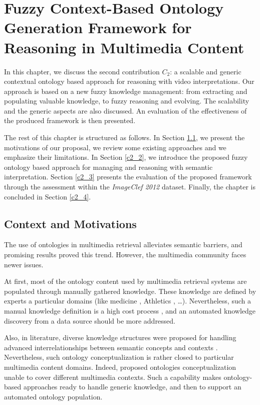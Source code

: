 \chapter{Fuzzy Context-Based Ontology Generation Framework for Reasoning in Multimedia Content}
\label{c2}
	In this chapter, we discuss the second contribution $C_{2}$: a scalable and generic contextual 
	ontology based approach for reasoning with video interpretations. Our approach is based on a new 
	fuzzy knowledge management: from extracting and populating valuable knowledge, to fuzzy reasoning 
	and evolving. The scalability and the generic aspects are also discussed. An evaluation of
	the effectiveness of the produced framework is then presented.

	The rest of this chapter is structured as follows. In Section \ref{c2_1}, we present the
 	motivations of our proposal, we review some existing approaches and we emphasize
 	their limitations. In Section \ref{c2_2}, we introduce the proposed fuzzy ontology based 
	approach for managing and reasoning with semantic interpretation. Section \ref{c2_3} 
	presents the evaluation of the proposed framework through the assessment within the 	
	\textit{ImageClef 2012} dataset. Finally, the chapter is concluded in Section \ref{c2_4}. 


	\section{Context and Motivations}
	\label{c2_1}
		The use of ontologies in multimedia retrieval alleviates semantic barriers, 
		and promising results proved this trend. However, the multimedia community faces newer issues.

		At first, most of the ontology content used by multimedia retrieval systems 
		are populated through manually gathered knowledge. These knowledge 
		are defined by experts a particular domains (like medicine 
		\citep{Rozilawatibinti2011}, Athletics \citep{Paliouras2011}, \dots). 
		Nevertheless, such a manual knowledge definition is a high cost 
		process \citep{Song2009}, 
		and an automated knowledge discovery from a data source should 
		be more addressed.

		Also, in literature, diverse knowledge structures were proposed for handling
		advanced interrelationships between semantic concepts and contexts 
		\citep{Bannour2014}. Nevertheless, such ontology conceptualization 
		is rather closed to particular multimedia content domains. Indeed, proposed ontologies 
		conceptualization  unable to cover different multimedia contexts. Such a capability 
		makes ontology-based 
		approaches ready to handle generic knowledge, and then to support an automated ontology population.

